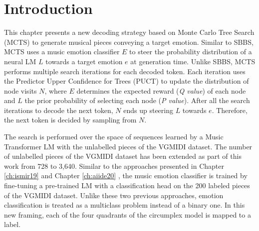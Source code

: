 \section{Introduction}


This chapter presents a new decoding strategy based on Monte Carlo Tree Search (MCTS) to generate musical pieces conveying a target emotion. Similar to SBBS, MCTS uses a music emotion classifier $E$ to steer the probability distribution of a neural LM $L$ towards a target emotion $e$ at generation time. Unlike SBBS, MCTS performs multiple search iterations for each decoded token. Each iteration uses the Predictor Upper Confidence for Trees (PUCT) to update the distribution of node visits $N$, where $E$ determines the expected reward (\textit{Q value}) of each node and $L$ the prior probability of selecting each node (\textit{P value}). After all the search iterations to decode the next token, $N$ ends up steering $L$ towards $e$. Therefore, the next token is decided by sampling from $N$.

The search is performed over the space of sequences learned by a Music Transformer LM \cite {huang2018music} with the unlabelled pieces of the VGMIDI dataset. The number of unlabelled pieces of the VGMIDI dataset has been extended as part of this work from 728 to 3,640. Similar to the approaches presented in Chapter \ref{ch:ismir19} \cite{ferreira_2019} and Chapter \ref{ch:aiide20} \cite{ferreira2020computer}, the music emotion classifier is trained by fine-tuning a pre-trained LM with a classification head on the 200 labeled pieces of the VGMIDI dataset. Unlike these two previous approaches, emotion classification is treated as a multiclass problem instead of a binary one. In this new framing, each of the four quadrants of the circumplex model is mapped to a label.

